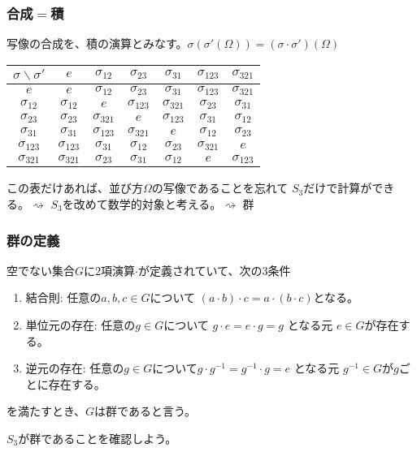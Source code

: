 \documentclass[12pt, t]{beamer}
\begin{document}
\begin{frame}
\frametitle{合成$=$積}
写像の合成を、積の演算とみなす。$\sigma(\sigma'(\Omega)) = (\sigma \cdot \sigma')(\Omega)$
\begin{center}
\begin{tabular}{c|cccccc}
  $\sigma \backslash \sigma'$ & $e$            & $\sigma_{12}$  & $\sigma_{23}$  & $\sigma_{31}$  & $\sigma_{123}$ & $\sigma_{321}$ \\ \hline
  $e$                         & $e$            & $\sigma_{12}$  & $\sigma_{23}$  & $\sigma_{31}$  & $\sigma_{123}$ & $\sigma_{321}$ \\
  $\sigma_{12}$               & $\sigma_{12}$  & $e$            & $\sigma_{123}$ & $\sigma_{321}$ & $\sigma_{23}$  & $\sigma_{31}$  \\
  $\sigma_{23}$               & $\sigma_{23}$  & $\sigma_{321}$ & $e$            & $\sigma_{123}$ & $\sigma_{31}$  & $\sigma_{12}$  \\
  $\sigma_{31}$               & $\sigma_{31}$  & $\sigma_{123}$ & $\sigma_{321}$ & $e$            & $\sigma_{12}$  & $\sigma_{23}$  \\
  $\sigma_{123}$              & $\sigma_{123}$ & $\sigma_{31}$  & $\sigma_{12}$  & $\sigma_{23}$  & $\sigma_{321}$ & $e$            \\
  $\sigma_{321}$              & $\sigma_{321}$ & $\sigma_{23}$  & $\sigma_{31}$  & $\sigma_{12}$  & $e$            & $\sigma_{123}$
\end{tabular}
\end{center}
この表だけあれば、並び方$\Omega$の写像であることを忘れて
$S_3$だけで計算ができる。$\rightsquigarrow$ $S_3$を改めて数学的対象と考える。$\rightsquigarrow$ 群
\end{frame}

\begin{frame}
\frametitle{群の定義}
空でない集合$G$に$2$項演算$\cdot$が定義されていて、次の$3$条件
\begin{enumerate}
\item 結合則: 任意の$a, b, c \in G$について $(a \cdot b) \cdot c = a \cdot (b \cdot c)$となる。
\item 単位元の存在: 任意の$g \in G$について $g \cdot e = e \cdot g = g$ となる元 $e \in G$が存在する。
\item 逆元の存在: 任意の$g \in G$について$g \cdot g^{-1} = g^{-1} \cdot g = e$ となる元 $g^{-1} \in G$が$g$ごとに存在する。
\end{enumerate}
を満たすとき、$G$は群であると言う。

$S_3$が群であることを確認しよう。
\end{frame}
\end{document}
